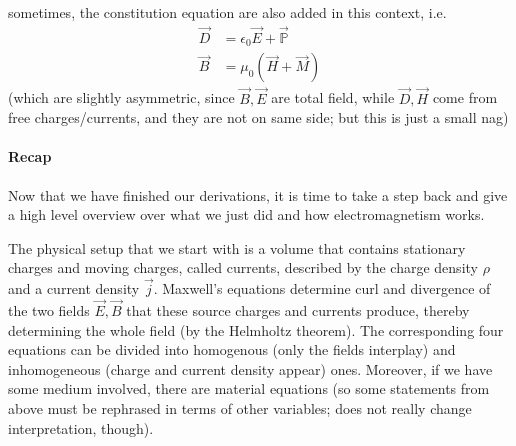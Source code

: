 \documentclass[../class_mech_main.tex]{subfiles}
\begin{document}
sometimes, the constitution equation are also added in this context, i.e.
\begin{subequations}
\begin{align}
    \vec{D} &= \epsilon_0 \vec{E} + \vec{\mathbb{P}}
    \\
    \vec{B} &= \mu_0 (\vec{H} + \vec{M})
\end{align}
\end{subequations}
(which are slightly asymmetric, since $\vec{B}, \vec{E}$ are total field, while $\vec{D}, \vec{H}$ come from free charges/currents, and they are not on same side; but this is just a small nag)



            \paragraph{Recap}
Now that we have finished our derivations, it is time to take a step back and give a high level overview over what we just did and how electromagnetism works.


The physical setup that we start with is a volume that contains stationary charges and moving charges, called currents, described by the charge density $\rho$ and a current density $\vec{j}$. Maxwell's equations determine curl and divergence of the two fields $\vec{E}, \vec{B}$ that these source charges and currents produce, thereby determining the whole field (by the Helmholtz theorem). The corresponding four equations can be divided into homogenous (only the fields interplay) and inhomogeneous (charge and current density appear) ones. Moreover, if we have some medium involved, there are material equations (so some statements from above must be rephrased in terms of other variables; does not really change interpretation, though).
\end{document}
